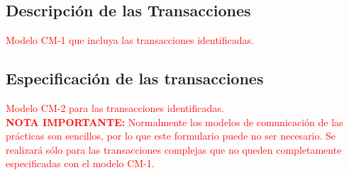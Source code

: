 \documentclass[12pt,a4paper,twoside,spanish]{article}      %
\begin{document}
\subsection{Descripción de las Transacciones}
\textcolor {red} {Modelo CM-1 que incluya las transacciones identificadas.}


\subsection{Especificación de las transacciones}

\textcolor {red} {
Modelo CM-2 para las transacciones identificadas.
\\
\textbf{NOTA IMPORTANTE:} Normalmente los modelos de comunicación de las prácticas son sencillos, por lo que este formulario puede no ser necesario. Se realizará sólo
para las transacciones complejas que no queden completamente
especificadas con el modelo CM-1.
}

\end{document}
